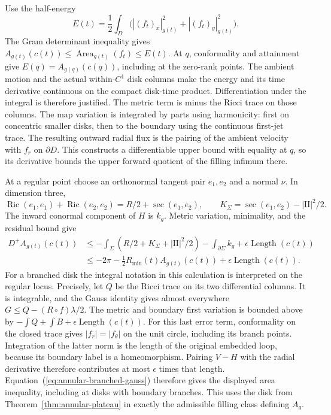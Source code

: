 Use the half-energy
\[
 E(t)=\frac12\int_D
    \bigl(|(f_t)_x|_{g(t)}^2+|(f_t)_y|_{g(t)}^2\bigr).
\]
The Gram determinant inequality gives
$A_{g(t)}(c(t))\le\operatorname{Area}_{g(t)}(f_t)\le E(t)$.
At $q$, conformality and attainment give
$E(q)=A_{g(q)}(c(q))$, including at the zero-rank points.
The ambient motion and the actual within-$C^1$ disk columns
make the energy and its time derivative continuous on the
compact disk-time product.  Differentiation under the integral
is therefore justified.  The metric term is minus the Ricci
trace on those columns.  The map variation is integrated by
parts using harmonicity: first on concentric smaller disks,
then to the boundary using the continuous first-jet trace.
The resulting outward radial flux is the pairing of the
ambient velocity with $f_r$ on $\partial D$.
This constructs a differentiable upper bound with equality at
$q$, so its derivative bounds the upper forward quotient of
the filling infimum there.

At a regular point choose an orthonormal tangent
pair $e_1,e_2$ and a normal $\nu$.  In dimension three,
\[
 \operatorname{Ric}(e_1,e_1)+\operatorname{Ric}(e_2,e_2)
     =R/2+\sec(e_1,e_2),\qquad
 K_\Sigma=\sec(e_1,e_2)-|\mathrm{II}|^2/2.
\]
The inward conormal component of $H$ is $k_g$.  Metric variation,
minimality, and the residual bound give
\begin{align*}
 D^+A_{g(t)}(c(t))
 &\le-\int_\Sigma(R/2+K_\Sigma+|\mathrm{II}|^2/2)
       -\int_{\partial\Sigma}k_g+\epsilon\operatorname{Length}(c(t))\\
 &\le-2\pi-\tfrac12R_{\min}(t)A_{g(t)}(c(t))
       +\epsilon\operatorname{Length}(c(t)).
\end{align*}
For a branched disk the integral notation in this calculation is
interpreted on the regular locus.  Precisely, let $Q$ be the Ricci
trace on its two differential columns.  It is integrable, and the
Gauss identity gives almost everywhere
$G\le Q-(R\circ f)\lambda/2$.
The metric and boundary first variation is bounded above by
$-\int Q+\int B+\epsilon\operatorname{Length}(c(t))$.
For this last error term, conformality on the closed trace
gives $|f_r|=|f_\theta|$ on the unit circle, including its
branch points.  Integration of the latter norm is the length
of the original embedded loop, because its boundary label is
a homeomorphism.  Pairing $V-H$ with the radial derivative
therefore contributes at most $\epsilon$ times that length.
Equation~(\ref{eq:annular-branched-gauss}) therefore gives the
displayed area inequality, including at disks with boundary
branches.  This uses the disk from Theorem~\ref{thm:annular-plateau}
in exactly the admissible filling class defining $A_g$.


